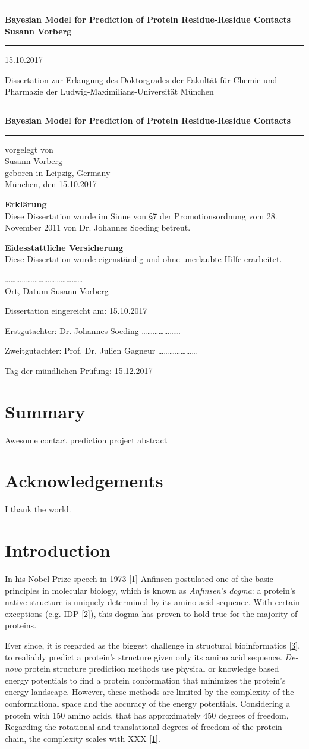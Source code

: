 \documentclass[12pt,a4paper,twoside]{book}
\newcommand{\LMUCover}[3]{
    \thispagestyle{empty}
    {\parindent0cm \rule{\linewidth}{.7ex}}
    
    \begin{flushright}
      \vspace*{\stretch{1}}
      \sffamily\bfseries\Huge
      #1\\
      \vspace*{\stretch{1}}
      \sffamily\bfseries\large
      #2
      \vspace*{\stretch{1}}
    \end{flushright}
  
    \rule{\linewidth}{.7ex}
    \vspace*{\stretch{5}}
    \vspace*{\stretch{1}}
    
    \begin{center}\sffamily\LARGE{#3}\end{center}
}
\newcommand{\LMUTitlePage}[4]{
    \thispagestyle{empty}
    \vspace*{\stretch{1}}
    
    \begin{center}
      \Large Dissertation zur Erlangung des Doktorgrades der Fakultät für Chemie und Pharmazie der Ludwig-Maximilians-Universität München
    \end{center}
    
    \vspace*{\stretch{1}}
    {\parindent0cm \rule{\linewidth}{.7ex}}
    
    \begin{flushright}
      \vspace*{\stretch{1}}
      \sffamily\bfseries\Huge
      #1\\
      \vspace*{\stretch{1}}
    \end{flushright}
  
    \rule{\linewidth}{.7ex}

    \vspace*{\stretch{3}}
    \begin{center}
      \Large vorgelegt von\\
      \Large #2\\
      \Large geboren in #3\\
      \vspace*{\stretch{2}}
      \Large München, den #4
    \end{center}
}
\newcommand{\LMUErklaerung}[5]{
    \thispagestyle{empty}
    \begin{flushleft}
      \large \textbf{Erklärung} \\[1mm]
      \large Diese Dissertation wurde im Sinne von §7 der Promotionsordnung vom 28. November 2011 von #2 betreut.
      \bigskip
  
      \large \textbf{Eidesstattliche Versicherung}\\[1mm]
      \large Diese Dissertation wurde eigenständig und ohne unerlaubte Hilfe erarbeitet.
      \vspace{5em}
  
      \dots\dots\dots   \dots\dots\dots \hfill \dots\dots\dots\dots\dots\dots\dots\dots\\
      \large Ort, Datum \hfill #1
      \vfill
  
  
      \large Dissertation eingereicht am: \hfill #4
      \bigskip
    
      \large Erstgutachter:  #2 \hfill \dots\dots\dots\dots\dots\dots\dots
      \bigskip
    
      \large Zweitgutachter: #3 \hfill \dots\dots\dots\dots\dots\dots\dots
      \bigskip
    
      \large Tag der mündlichen Prüfung: \hfill #5
    \end{flushleft}
}
\theoremstyle{definition}
\theoremstyle{definition}
\theoremstyle{remark}
\begin{document}
\frontmatter

\LMUCover
	{Bayesian Model for Prediction of Protein Residue-Residue Contacts}
	{Susann Vorberg}
	{15.10.2017}

\newpage
\thispagestyle{empty}
\cleardoublepage

\LMUTitlePage
	{Bayesian Model for Prediction of Protein Residue-Residue Contacts}
	{Susann Vorberg}
	{Leipzig, Germany}
	{15.10.2017}

\newpage
\thispagestyle{empty}
\cleardoublepage

\LMUErklaerung
	{Susann Vorberg}
	{Dr. Johannes Soeding}
	{Prof. Dr. Julien Gagneur}
	{15.10.2017}
	{15.12.2017}

\newpage
\thispagestyle{empty}
\cleardoublepage
\frontmatter\setcounter{page}{1}

\chapter*{Summary}\label{summary}

Awesome contact prediction project abstract

\chapter*{Acknowledgements}\label{acknowledgements}

I thank the world.

\tableofcontents
{}

\mainmatter \setcounter{page}{1}

\chapter{Introduction}\label{general-intro}

In his Nobel Prize speech in 1973
{[}\protect\hyperlink{ref-Anfinsen1973}{1}{]} Anfinsen postulated one of
the basic principles in molecular biology, which is known as
\emph{Anfinsen's dogma}: a protein's native structure is uniquely
determined by its amino acid sequence. With certain exceptions (e.g.
\protect\hyperlink{abbrev}{IDP}
{[}\protect\hyperlink{ref-Wright1999}{2}{]}), this dogma has proven to
hold true for the majority of proteins.

Ever since, it is regarded as the biggest challenge in structural
bioinformatics {[}\protect\hyperlink{ref-Samish2015}{3}{]}, to realiably
predict a protein's structure given only its amino acid sequence.
\emph{De-novo} protein structure prediction methods use physical or
knowledge based energy potentials to find a protein conformation that
minimizes the protein's energy landscape. However, these methods are
limited by the complexity of the conformational space and the accuracy
of the energy potentials. Considering a protein with 150 amino acids,
that has approximately 450 degrees of freedom, Regarding the rotational
and translational degrees of freedom of the protein chain, the
complexity scales with XXX
{[}\protect\hyperlink{ref-Anfinsen1973}{1}{]}.
\end{document}
